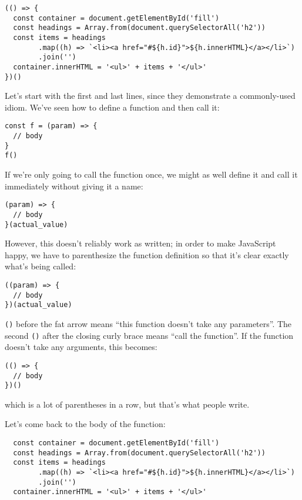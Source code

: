 \begin{verbatim}
(() => {
  const container = document.getElementById('fill')
  const headings = Array.from(document.querySelectorAll('h2'))
  const items = headings
        .map((h) => `<li><a href="#${h.id}">${h.innerHTML}</a></li>`)
        .join('')
  container.innerHTML = '<ul>' + items + '</ul>'
})()
\end{verbatim}

Let's start with the first and last lines,
since they demonstrate a commonly-used idiom.
We've seen how to define a function and then call it:

\begin{verbatim}
const f = (param) => {
  // body
}
f()
\end{verbatim}

If we're only going to call the function once,
we might as well define it and call it immediately without giving it a name:

\begin{verbatim}
(param) => {
  // body
}(actual_value)
\end{verbatim}

However,
this doesn't reliably work as written;
in order to make JavaScript happy,
we have to parenthesize the function definition
so that it's clear exactly what's being called:

\begin{verbatim}
((param) => {
  // body
})(actual_value)
\end{verbatim}

\texttt{()} before the fat arrow means ``this function doesn't take any parameters''.
The second \texttt{()} after the closing curly brace means ``call the function''.
If the function doesn't take any arguments,
this becomes:

\begin{verbatim}
(() => {
  // body
})()
\end{verbatim}

\noindent
which is a lot of parentheses in a row,
but that's what people write.

Let's come back to the body of the function:

\begin{verbatim}
  const container = document.getElementById('fill')
  const headings = Array.from(document.querySelectorAll('h2'))
  const items = headings
        .map((h) => `<li><a href="#${h.id}">${h.innerHTML}</a></li>`)
        .join('')
  container.innerHTML = '<ul>' + items + '</ul>'
\end{verbatim}

